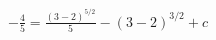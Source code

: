 \documentclass[preview]{standalone}
\begin{document}
\begin{align*}
-\frac{4}{5} = \frac{(3-2)^{5/2}}{5} - (3-2)^{3/2} + c
\end{align*}
\end{document}
